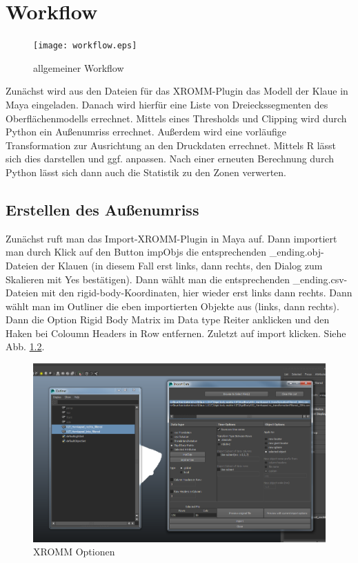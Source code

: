 \documentclass[a4paper, openany, oneside]{memoir}
\begin{document}
\chapter{Workflow}
\begin{figure}
\begin{center}
\texttt{[image: workflow.eps]}
\end{center}
\caption{allgemeiner Workflow}
\label{img_workflow}
\end{figure}
Zunächst wird aus den Dateien für das XROMM-Plugin das Modell der Klaue in Maya eingeladen. Danach wird hierfür eine Liste von Dreieckssegmenten des Oberflächenmodells errechnet. Mittels eines Thresholds und Clipping wird durch Python ein Außenumriss errechnet. Außerdem wird eine vorläufige Transformation zur Ausrichtung an den Druckdaten errechnet. Mittels R lässt sich dies darstellen und ggf. anpassen. Nach einer erneuten Berechnung durch Python lässt sich dann auch die Statistik zu den Zonen verwerten.
\section{Erstellen des Außenumriss}
Zunächst ruft man das Import-XROMM-Plugin in Maya auf. Dann importiert man durch Klick auf den Button impObjs die entsprechenden \file_ending{.obj}-Dateien der Klauen (in diesem Fall erst links, dann rechts, den Dialog zum Skalieren mit Yes bestätigen). Dann wählt man die entsprechenden \file_ending{.csv}-Dateien mit den rigid-body-Koordinaten, hier wieder erst links dann rechts. Dann wählt man im Outliner die eben importierten Objekte aus (links, dann rechts). Dann die Option Rigid Body Matrix im Data type Reiter anklicken und den Haken bei Coloumn Headers in Row entfernen. Zuletzt auf import klicken. Siehe Abb. \ref{img_xromm_options}.

\begin{figure}
\begin{center}
\includegraphics[height = 0.5\textheight, width=1\textwidth,keepaspectratio]{xromm.png}
\end{center}
\caption{XROMM Optionen}
\label{img_xromm_options}
\end{figure}
\end{document}
